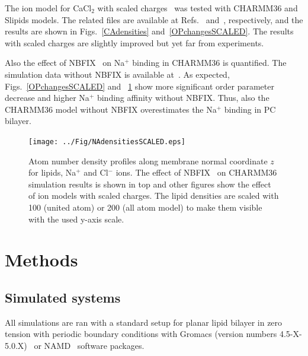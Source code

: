 \documentclass[twoside,twocolumn,9pt]{article}
\begin{document}
The ion model for CaCl$_2$ with scaled charges~\cite{kohagen14} was tested with CHARMM36 and Slipids models.
The related files are available at Refs.~ and~,
respectively, and the results are shown in Figs.~\ref{CAdensities} and~\ref{OPchangesSCALED}.
The results with scaled charges are slightly improved but yet far from experiments.

Also the effect of NBFIX~\cite{venable13} on Na$^+$ binding in CHARMM36 is quantified.
The simulation data without NBFIX is available at~\cite{charmmPOPC350mMNaClnoNBFIXfiles}.
As expected, Figs.~\ref{OPchangesSCALED} and ~\ref{NAdensitySCALED} show 
more significant order parameter decrease and higher Na$^+$ binding affinity
without NBFIX. Thus, also the CHARMM36 model without NBFIX overestimates the
Na$^+$ binding in PC bilayer.




\begin{figure}[h]
  \centering
  \texttt{[image: ../Fig/NAdensitiesSCALED.eps]} 
  \caption{\label{NAdensitySCALED}
    Atom number density profiles along membrane normal coordinate $z$ for lipids, Na$^+$ and Cl$^-$ ions. 
    The effect of NBFIX~\cite{venable13} on CHARMM36 simulation results is shown in top and other figures show the
    effect of ion models with scaled charges. The lipid densities are scaled with 100 (united atom) or 200 (all atom model) to make them visible with the used y-axis scale.
}
\end{figure}
\section{Methods}

\subsection{Simulated systems}
All simulations are ran with a standard setup for planar lipid bilayer in zero tension
with periodic boundary conditions with Gromacs (version numbers 4.5-X-5.0.X)~\cite{pronk13,abraham15} 
or NAMD~\cite{NAMD} software packages.
\end{document}

